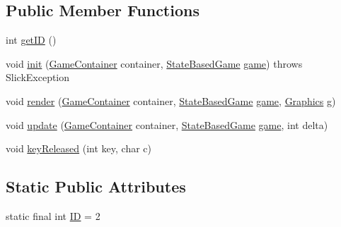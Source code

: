 \subsection*{Public Member Functions}
\begin{DoxyCompactItemize}
\item 
int \mbox{\hyperlink{classorg_1_1newdawn_1_1slick_1_1tests_1_1states_1_1_test_state2_a953f427bf8f09b723e036ee8eb5b455c}{get\+ID}} ()
\item 
void \mbox{\hyperlink{classorg_1_1newdawn_1_1slick_1_1tests_1_1states_1_1_test_state2_a90fa7ac501b43d077653fbb8e158fe82}{init}} (\mbox{\hyperlink{classorg_1_1newdawn_1_1slick_1_1_game_container}{Game\+Container}} container, \mbox{\hyperlink{classorg_1_1newdawn_1_1slick_1_1state_1_1_state_based_game}{State\+Based\+Game}} \mbox{\hyperlink{classorg_1_1newdawn_1_1slick_1_1tests_1_1states_1_1_test_state2_a76ea26ba609bd0c48b8690f2e797763a}{game}})  throws Slick\+Exception 
\item 
void \mbox{\hyperlink{classorg_1_1newdawn_1_1slick_1_1tests_1_1states_1_1_test_state2_a28f05d3267f4376851287e4696808182}{render}} (\mbox{\hyperlink{classorg_1_1newdawn_1_1slick_1_1_game_container}{Game\+Container}} container, \mbox{\hyperlink{classorg_1_1newdawn_1_1slick_1_1state_1_1_state_based_game}{State\+Based\+Game}} \mbox{\hyperlink{classorg_1_1newdawn_1_1slick_1_1tests_1_1states_1_1_test_state2_a76ea26ba609bd0c48b8690f2e797763a}{game}}, \mbox{\hyperlink{classorg_1_1newdawn_1_1slick_1_1_graphics}{Graphics}} g)
\item 
void \mbox{\hyperlink{classorg_1_1newdawn_1_1slick_1_1tests_1_1states_1_1_test_state2_a1ecb35eb7dcbd78c01c63e36a9be9580}{update}} (\mbox{\hyperlink{classorg_1_1newdawn_1_1slick_1_1_game_container}{Game\+Container}} container, \mbox{\hyperlink{classorg_1_1newdawn_1_1slick_1_1state_1_1_state_based_game}{State\+Based\+Game}} \mbox{\hyperlink{classorg_1_1newdawn_1_1slick_1_1tests_1_1states_1_1_test_state2_a76ea26ba609bd0c48b8690f2e797763a}{game}}, int delta)
\item 
void \mbox{\hyperlink{classorg_1_1newdawn_1_1slick_1_1tests_1_1states_1_1_test_state2_a6aef9051f7b1fa3160df296bd37a6941}{key\+Released}} (int key, char c)
\end{DoxyCompactItemize}
\subsection*{Static Public Attributes}
\begin{DoxyCompactItemize}
\item 
static final int \mbox{\hyperlink{classorg_1_1newdawn_1_1slick_1_1tests_1_1states_1_1_test_state2_af4acaeb03d81e63e05f853dbb1ef1190}{ID}} = 2
\end{DoxyCompactItemize}
